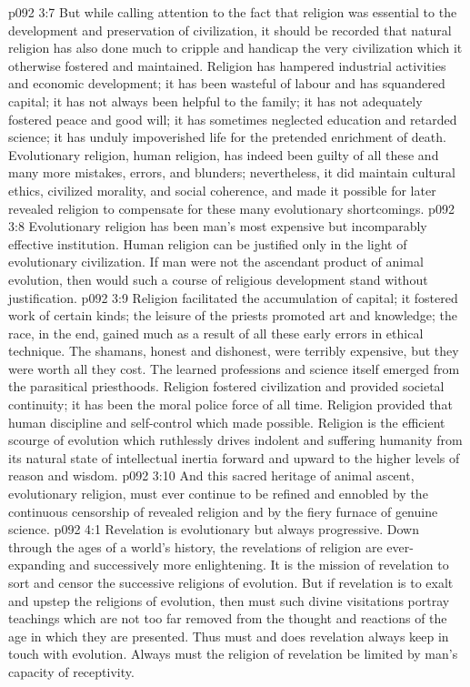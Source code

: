 \vs p092 3:7 But while calling attention to the fact that religion was essential to the development and preservation of civilization, it should be recorded that natural religion has also done much to cripple and handicap the very civilization which it otherwise fostered and maintained. Religion has hampered industrial activities and economic development; it has been wasteful of labour and has squandered capital; it has not always been helpful to the family; it has not adequately fostered peace and good will; it has sometimes neglected education and retarded science; it has unduly impoverished life for the pretended enrichment of death. Evolutionary religion, human religion, has indeed been guilty of all these and many more mistakes, errors, and blunders; nevertheless, it did maintain cultural ethics, civilized morality, and social coherence, and made it possible for later revealed religion to compensate for these many evolutionary shortcomings.
\vs p092 3:8 \pc Evolutionary religion has been man’s most expensive but incomparably effective institution. Human religion can be justified only in the light of evolutionary civilization. If man were not the ascendant product of animal evolution, then would such a course of religious development stand without justification.
\vs p092 3:9 \pc Religion facilitated the accumulation of capital; it fostered work of certain kinds; the leisure of the priests promoted art and knowledge; the race, in the end, gained much as a result of all these early errors in ethical technique. The shamans, honest and dishonest, were terribly expensive, but they were worth all they cost. The learned professions and science itself emerged from the parasitical priesthoods. Religion fostered civilization and provided societal continuity; it has been the moral police force of all time. Religion provided that human discipline and self\hyp{}control which made  possible. Religion is the efficient scourge of evolution which ruthlessly drives indolent and suffering humanity from its natural state of intellectual inertia forward and upward to the higher levels of reason and wisdom.
\vs p092 3:10 And this sacred heritage of animal ascent, evolutionary religion, must ever continue to be refined and ennobled by the continuous censorship of revealed religion and by the fiery furnace of genuine science.
\vs p092 4:1 Revelation is evolutionary but always progressive. Down through the ages of a world’s history, the revelations of religion are ever\hyp{}expanding and successively more enlightening. It is the mission of revelation to sort and censor the successive religions of evolution. But if revelation is to exalt and upstep the religions of evolution, then must such divine visitations portray teachings which are not too far removed from the thought and reactions of the age in which they are presented. Thus must and does revelation always keep in touch with evolution. Always must the religion of revelation be limited by man’s capacity of receptivity.
